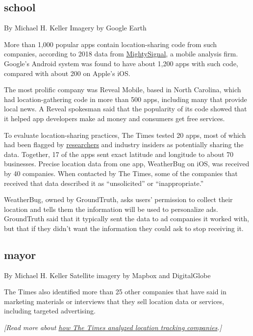 \hypertarget{school}{%
\subsection{school}\label{school}}

By Michael H. Keller \textbar{} Imagery by Google Earth

More than 1,000 popular apps contain location-sharing code from such
companies, according to 2018 data from
\href{https://mightysignal.com/}{MightySignal}, a mobile analysis firm.
Google's Android system was found to have about 1,200 apps with such
code, compared with about 200 on Apple's iOS.

The most prolific company was Reveal Mobile, based in North Carolina,
which had location-gathering code in more than 500 apps, including many
that provide local news. A Reveal spokesman said that the popularity of
its code showed that it helped app developers make ad money and
consumers get free services.

To evaluate location-sharing practices, The Times tested 20 apps, most
of which had been flagged by
\href{https://www.appcensus.mobi/}{researchers} and industry insiders as
potentially sharing the data. Together, 17 of the apps sent exact
latitude and longitude to about 70 businesses. Precise location data
from one app, WeatherBug on iOS, was received by 40 companies. When
contacted by The Times, some of the companies that received that data
described it as ``unsolicited'' or ``inappropriate.''

WeatherBug, owned by GroundTruth, asks users' permission to collect
their location and tells them the information will be used to
personalize ads. GroundTruth said that it typically sent the data to ad
companies it worked with, but that if they didn't want the information
they could ask to stop receiving it.

\hypertarget{mayor}{%
\subsection{mayor}\label{mayor}}

By Michael H. Keller \textbar{} Satellite imagery by Mapbox and
DigitalGlobe

The Times also identified more than 25 other companies that have said in
marketing materials or interviews that they sell location data or
services, including targeted advertising.

\emph{{[}Read more about
\href{https://www.nytimes.com/2018/12/10/technology/location-tracking-apps-privacy.html?action=click\&module=Intentional\&pgtype=Article}{how
The Times analyzed location tracking companies}.{]}}

